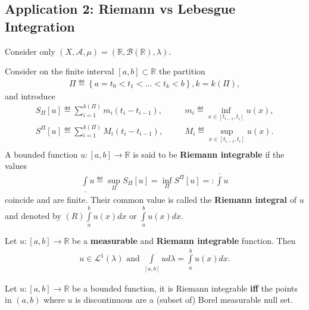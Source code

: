 \subsection*{Application 2: Riemann vs Lebesgue Integration}
Consider only \(\left(X,\mathscr{A},\mu\right) = \left(\mathbb{R},\mathscr{B}(\mathbb{R}),\lambda\right)\).
\ifdetailed
\begin{definition}
    Consider on the finite interval \([a,b]\subset\mathbb{R}\) the partition
    \begin{align}
        \Pi \eqdef \left\{ a=t_0<t_1<...<t_k<b \right\}, k=k(\Pi),
    \end{align}
    and introduce
    \begin{eqnarray}
        S_{\Pi}[u] \eqdef \sum\limits_{i=1}^{k(\Pi)}m_i(t_i-t_{i-1}), &\quad& m_i \eqdef\inf\limits_{x\in[t_{i-1}, t_i]}u(x), \\
        S^{\Pi}[u] \eqdef \sum\limits_{i=1}^{k(\Pi)}M_i(t_i-t_{i-1}), &\quad& M_i \eqdef\sup\limits_{x\in[t_{i-1}, t_i]}u(x). \\
    \end{eqnarray}
    A bounded function \(u:[a,b]\rightarrow\mathbb{R}\) is said to be \textbf{Riemann integrable} if the values
    \begin{align}
        \int\limits_{\_} u \eqdef \sup\limits_{\Pi}S_{\Pi}[u] = \inf\limits_{\Pi}S^{\Pi}[u] =\mathrel{\mathop:} \int\limits^{\_} u
    \end{align}
    coincide and are finite. Their common value is called the \textbf{Riemann integral} of \(u\) and denoted by 
    \((R)\int\limits_{a}^{b}u(x)dx\) or \(\int\limits_{a}^{b}u(x)dx\).
\end{definition}
\fi 
\begin{theorem}
    Let \(u:[a,b]\rightarrow\mathbb{R}\) be a \textbf{measurable} and \textbf{Riemann integrable} function. Then
    \begin{align}
        u\in\mathcal{L}^{1}(\lambda) \text{ and } \int\limits_{[a,b]}ud\lambda = \int\limits_{a}^{b}u(x)dx.
    \end{align}
\end{theorem}
\begin{theorem} \label{theorem:12_9}
    Let \(u:[a,b] \rightarrow \mathbb{R}\) be a bounded function, it is Riemann integrable \textbf{iff} the points in \(\left(a,b\right)\) where
    \(u\) is discontinuous are a (subset of) Borel measurable null set.
\end{theorem}

